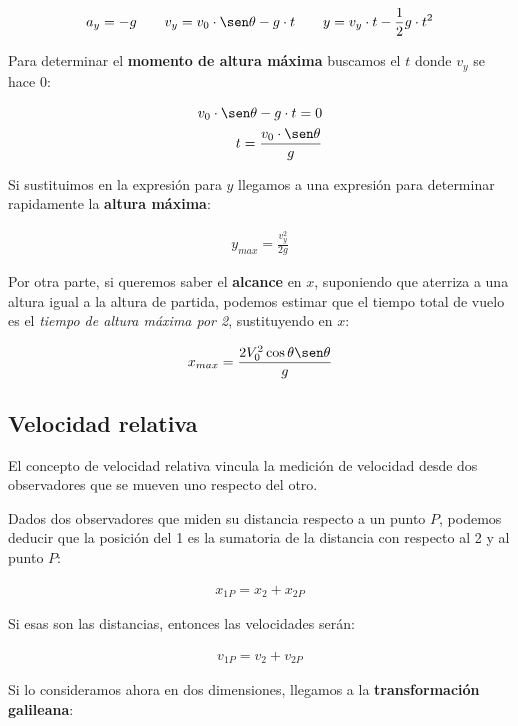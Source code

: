 \begin{align*}
    a_y = -g \qquad v_y = v_0 \cdot \sen\theta - g \cdot t \qquad y = v_y \cdot t - \frac{1}{2}g \cdot t^{2}
\end{align*}

Para determinar el \textbf{momento de altura máxima} buscamos el \(t\) 
donde \(v_y\) se hace 0:

\begin{align*}
    v_0 \cdot \sen\theta - g \cdot t = 0 \\
    t = \frac{v_0 \cdot \sen\theta}{g}
\end{align*}

Si sustituimos en la expresión para \(y\) llegamos a una expresión para 
determinar rapidamente la \textbf{altura máxima}: 

\begin{align*}
    y_{max} = \frac{v_y^{2}}{2g}
\end{align*}

Por otra parte,
si queremos saber el \textbf{alcance} en \(x\),
suponiendo que aterriza a una altura igual a la altura de partida,
podemos estimar que el tiempo total de vuelo es el \textit{tiempo de altura máxima por 2},
sustituyendo en \(x\):

\begin{align*}
    x_{max} = \frac{2V_0^{2}\cos\theta\sen\theta}{g}
\end{align*}

\subsection{Velocidad relativa}

El concepto de velocidad relativa vincula la medición de velocidad desde dos 
observadores que se mueven uno respecto del otro.

Dados dos observadores que miden su distancia respecto a un punto \(P\),
podemos deducir que la posición del 1 es la sumatoria de la distancia con respecto 
al 2 y al punto \(P\):

\begin{align*}
    x_{1P} = x_2 + x_{2P}
\end{align*}

Si esas son las distancias, entonces las velocidades serán:

\begin{align*}
    v_{1P} = v_{2} + v_{2P}
\end{align*}

Si lo consideramos ahora en dos dimensiones,
llegamos a la \textbf{transformación galileana}:

